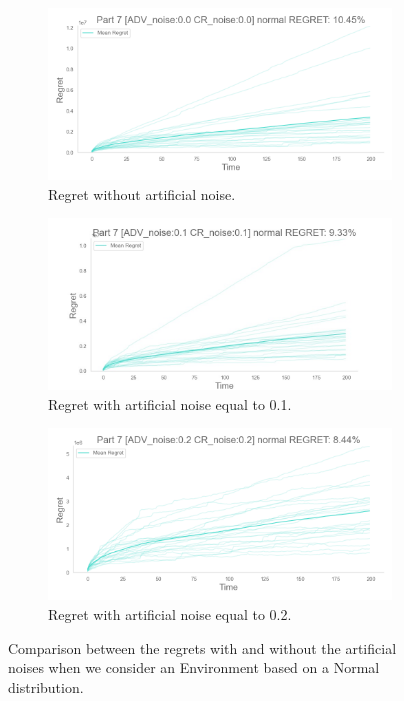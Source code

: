 \begin{figure}[!htb]
    \centering

    \begin{subfigure}[!H]{0.8\textwidth}
        \centering
        \includegraphics[width=\textwidth]{images/part7_normal_regret_noise00.png}
        \caption{Regret without artificial noise.}
    \end{subfigure}

    \begin{subfigure}[!H]{0.8\textwidth}
        \centering
        \includegraphics[width=\textwidth]{images/part7_normal_regret_noise01.jpeg}
        \caption{Regret with artificial noise equal to 0.1.}
    \end{subfigure}

    \begin{subfigure}[!H]{0.8\textwidth}
        \centering
        \includegraphics[width=\textwidth]{images/part7_normal_regret_noise02.png}
        \caption{Regret with artificial noise equal to 0.2.}
    \end{subfigure}

    \caption{Comparison between the regrets with and without the artificial noises when we consider an Environment based on a Normal distribution.}
    \label{fig:RegretsPart7Normal}
\end{figure}